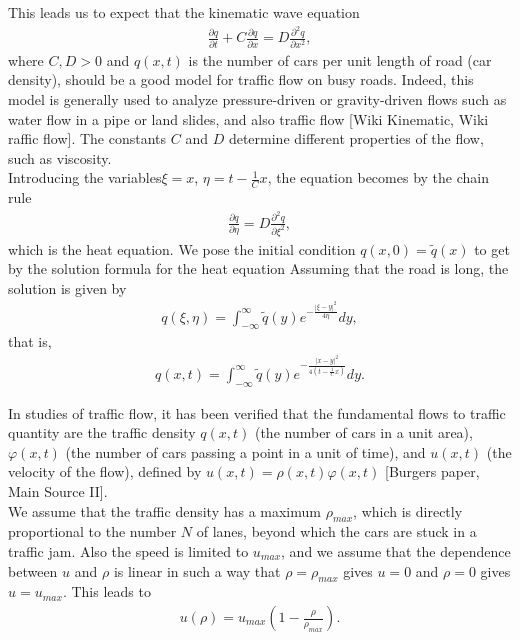 \documentclass[12pt]{article}
\begin{document}
This leads us to expect that the kinematic wave equation 
\begin{align*}
\frac{\partial q}{\partial t}+C\frac{\partial q}{\partial x}=D\frac{\partial^2{q}}{\partial x^2},
\end{align*}
where $C,D>0$ and $q(x,t)$ is the number of cars per unit length of road (car density), should be a good model for traffic flow on busy roads.  Indeed, this model is generally used to analyze pressure-driven or gravity-driven flows such as water flow in a pipe or land slides, and also traffic flow [Wiki Kinematic, Wiki raffic flow]. The constants $C$ and $D$ determine different properties of the flow, such as viscosity. \\

Introducing the variables$\xi=x$,  $\eta=t-\frac{1}{C}x$, the equation becomes by the chain rule
\begin{align*}
\frac{\partial q}{\partial \eta}=D\frac{\partial^2 q}{\partial\xi^2},
\end{align*}
which is the heat equation. We pose the initial condition $q(x,0)=\tilde{q}(x)$ to get by the solution formula for the heat equation Assuming that the road is long, the solution is given by
\begin{align*}
q(\xi, \eta)=\int_{-\infty}^{\infty} \tilde{q}(y)e^{-\frac{|\xi-y|^2}{4\eta}}dy,
\end{align*}
that is, 
\begin{align*}
q(x,t)=\int_{-\infty}^{\infty} \tilde{q}(y)e^{-\frac{|x-y|^2}{4(t-\frac{1}{C}x)}}dy.
\end{align*}

In studies of traffic flow, it has been verified that the fundamental flows to traffic quantity are the traffic density $q(x,t)$ (the number of cars in a unit area), $\varphi(x,t)$ (the number of cars passing a point in a unit of time), and $u(x,t)$ (the velocity of the flow), defined by $u(x,t)=\rho(x,t)\varphi(x,t)$ [Burgers paper, Main Source II].\\

We assume that the traffic density has a maximum $\rho_{max}$, which is directly proportional to the number $N$ of lanes, beyond which the cars are stuck in a traffic jam. Also the speed is limited to $u_{max}$, and we assume that the dependence between $u$ and $\rho$ is linear in such a way that $\rho=\rho_{max}$ gives $u=0$ and $\rho=0$ gives $u=u_{max}$. This leads to
\begin{align*}
u(\rho)=u_{max}\left(1-\frac{\rho}{\rho_{max}}\right).
\end{align*}
\end{document}
